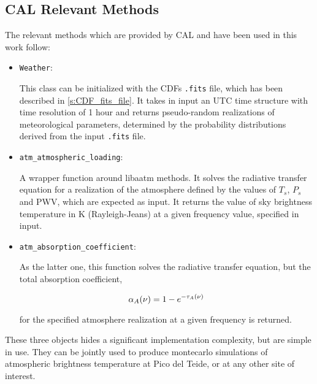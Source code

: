 \subsection{CAL Relevant Methods}

The relevant methods which are provided by CAL and have been used in this
work follow:

\begin{itemize}
        \item \texttt{Weather}:

        This class can be initialized with the CDFs \texttt{.fits} file, which
        has been described in \autoref{s:CDF_fits_file}. It takes in input
        an UTC time structure with time resolution of \num{1} hour and
        returns pseudo-random realizations of meteorological parameters,
        determined by the probability distributions derived from the input
        \texttt{.fits} file.

        \item \texttt{atm\_atmospheric\_loading}:

        A wrapper function around libaatm methods. It solves the radiative
        transfer equation for a realization of the atmosphere defined by
        the values of $T_s$,
        $P_s$ and PWV, which are expected as input. It returns the value of sky
        brightness temperature in \si{\kelvin} (Rayleigh-Jeans) at a given
        frequency value, specified in input.

        \item \texttt{atm\_absorption\_coefficient}:

        As the latter one, this function solves the radiative transfer equation,
        but the total absorption coefficient,

        \begin{equation}
                \alpha_A\qty(\nu) = 1 - e^{-\tau_A\qty(\nu)}
        \end{equation}

        for the specified atmosphere realization at a given frequency is
        returned.
\end{itemize}

These three objects hides a significant implementation complexity, but are
simple in use. They can be jointly used to produce montecarlo simulations of
atmospheric brightness temperature at Pico del Teide, or at any other site
of interest.


